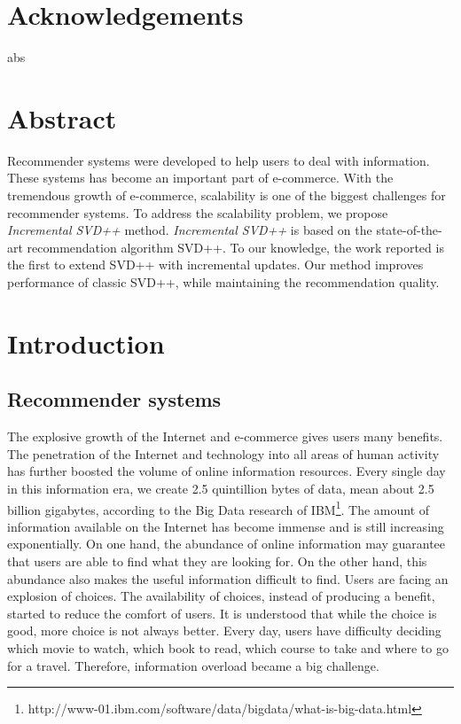 \documentclass[oneside,13pt]{extreport}
\begin{document}
\clearpage
%
\chapter*{Acknowledgements}
\renewcommand{\thepage}{\roman{page}}
\setcounter{page}{1}

abs

\renewcommand\contentsname{Table of contents}
\tableofcontents
\clearpage

\listoffigures
 \clearpage
 
\listoftables
 

\chapter*{Abstract}
Recommender systems were developed to help users to deal with information. These systems has become an important part of e-commerce. With the tremendous growth of e-commerce, scalability is one of the biggest challenges for recommender systems. 
To address the scalability problem, we propose \textit{Incremental SVD++} method. \textit{Incremental SVD++} is based on the state-of-the-art recommendation algorithm SVD++. To our knowledge, the work reported is the first to extend SVD++ with incremental updates. Our method improves performance of classic SVD++, while maintaining the recommendation quality.

\chapter{Introduction}
\renewcommand{\thepage}{\arabic{page}}
\setcounter{page}{1}
\section{Recommender systems}
The explosive growth  of the Internet and e-commerce gives users many benefits. The penetration of the Internet and technology into all areas of human activity has further boosted the volume of online information resources. Every single day in this information era, we create 2.5 quintillion bytes of data, mean about 2.5 billion gigabytes, according to the Big Data research of IBM\footnote{http://www-01.ibm.com/software/data/bigdata/what-is-big-data.html}. The amount of information available on the Internet has become immense and is still increasing exponentially. On one hand, the abundance of online information may guarantee that users are able to find what they are looking for. On the other hand, this abundance also makes the useful information difficult to find. Users are facing an explosion of choices. The availability of choices, instead of producing a benefit, started to reduce the comfort of users. It is understood that while the choice is good, more choice is not always better. Every day, users have difficulty deciding which movie to watch, which book to read, which course to take and where to go for a travel. Therefore, information overload became a big challenge. 
\end{document}
